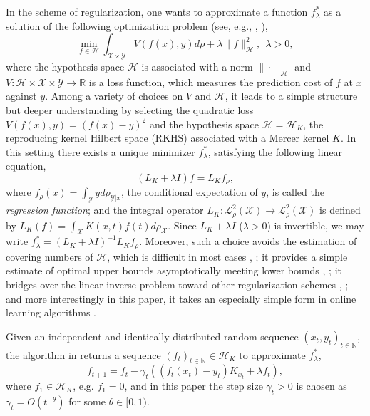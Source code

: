 \documentclass[twoside,twocolumn,journal]{IEEEtran}
\def\N{{\mathbb N}}
\def\R{{\mathbb R}}        %
\def\L{{\mathscr L}}
\def\H{{\mathscr H}}
\def\X{{\mathscr X}}
\def\Y{{\mathscr Y}}
\begin{document}
In the scheme of regularization, one wants to
approximate a function $f^\ast_\lambda$ as a solution of the following
optimization problem (see, e.g., \cite{EvgPonPog99}, \cite{PogSma03}),
\begin{equation} \label{eq:rls}
 \min_{f\in \H} \int_{\X\times \Y} V(f(x),y) d \rho + \lambda \|f\|^2_\H, \ \ \lambda>0,
\end{equation}
where the hypothesis space $\H$ is associated with a norm $\|\cdot\|_\H$ and
$V:\H\times \X\times \Y \to \R$ is a loss function, which measures the prediction cost of $f$ at $x$ against $y$.
Among a variety of choices on $V$ and $\H$, it leads to a simple structure but deeper understanding by selecting the quadratic loss
$V(f(x),y)=(f(x)-y)^2$ and the hypothesis space $\H=\H_K$, the reproducing kernel Hilbert space (RKHS) associated with a
Mercer kernel $K$. In this setting there exists a unique minimizer $f^\ast_\lambda$, satisfying the following linear equation,
\begin{equation}  \label{eq:lineq}
(L_K + \lambda I)f = L_K f_\rho ,
\end{equation}
where $f_\rho(x) = \int_\Y y d \rho_{\Y|x}$, the conditional expectation of $y$, is called the \emph{regression
function}; and the integral operator $L_K:\L^2_\rho(\X) \to \L^2_\rho(\X)$ is defined by $ L_K(f)=\int_\X K(x,t) f(t) d \rho_\X$.
Since $L_K+\lambda I$ ($\lambda>0$) is invertible, we may write $f^\ast_\lambda = (L_K + \lambda I )^{-1} L_K f_\rho$.
Moreover, such a choice avoids the estimation of covering numbers of $\H$,
which is difficult in most cases \cite{CucSma02}, \cite{Zhou03}; it provides a simple estimate of optimal upper bounds asymptotically meeting
lower bounds \cite{SmaZho-ShannonIII}, \cite{CapDev05}; it bridges over the linear inverse problem toward other regularization schemes
\cite{DevRosCap04}, \cite{EngHanNeu00}; and more interestingly in this paper, it takes an especially simple form in online learning
algorithms \cite{SmaYao04}.

Given an independent and identically distributed random sequence $(x_t,y_t)_{t\in \N}$, the algorithm in \cite{SmaYao04} returns a sequence
$(f_t)_{t\in\N}\in \H_K$ to approximate $f^\ast_\lambda$,
\begin{equation}\label{eq:rkhs}
f_{t+1} = f_t - \gamma_t(( f_t(x_t)-y_t) K_{x_t} +\lambda f_t ),
\end{equation}
where $f_1\in \H_K$, e.g. $f_1=0$, and in this paper the step size $\gamma_t>0$ is chosen as $\gamma_t=O(t^{-\theta})$ for some $\theta \in [0,1)$.
\end{document}
